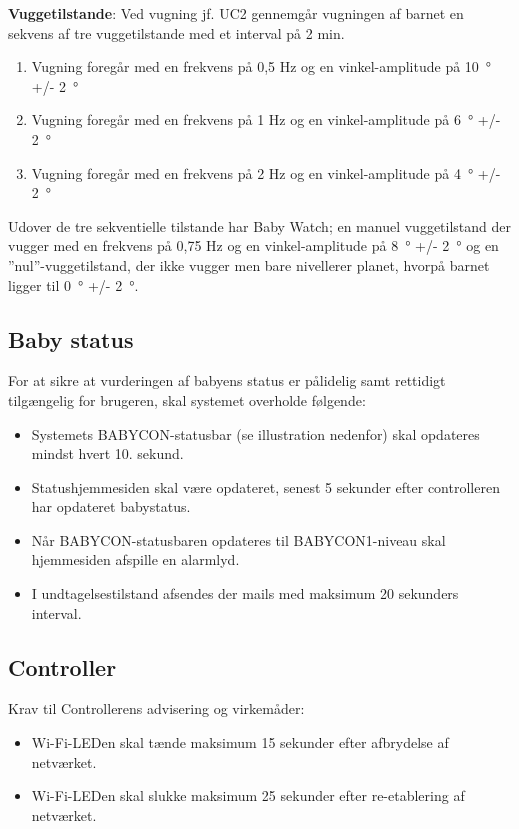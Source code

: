 \textbf{Vuggetilstande}: \label{kravspec:ikke_funk_vuggetilstande}
Ved vugning jf. UC2 gennemgår vugningen af barnet en sekvens af tre vuggetilstande med et interval på 2 min.
\begin{enumerate}

\item Vugning foregår med en frekvens på 0,5 Hz og en vinkel-amplitude på \SI{10}{\degree} +/- \SI{2}{\degree}
\item Vugning foregår med en frekvens på 1 Hz og en vinkel-amplitude på \SI{6}{\degree} +/- \SI{2}{\degree}
\item Vugning foregår med en frekvens på 2 Hz og en vinkel-amplitude på \SI{4}{\degree} +/- \SI{2}{\degree}
\end{enumerate}

Udover de tre sekventielle tilstande har Baby Watch; en manuel vuggetilstand der vugger med en frekvens på 0,75 Hz og en vinkel-amplitude på \SI{8}{\degree} +/- \SI{2}{\degree} og en ''nul''-vuggetilstand, der ikke vugger men bare nivellerer planet, hvorpå barnet ligger til \SI{0}{\degree} +/- \SI{2}{\degree}.

\subsection*{Baby status}
For at sikre at vurderingen af babyens status er pålidelig samt rettidigt tilgængelig for brugeren, skal systemet overholde følgende:
\begin{itemize}
\item Systemets BABYCON-statusbar (se illustration nedenfor) skal opdateres mindst hvert 10. sekund.
\item Statushjemmesiden skal være opdateret, senest 5 sekunder efter controlleren har opdateret babystatus.
\item Når BABYCON-statusbaren opdateres til BABYCON1-niveau skal hjemmesiden afspille en alarmlyd.
\item I undtagelsestilstand afsendes der mails med maksimum 20 sekunders interval. 
\end{itemize}

\subsection*{Controller}
Krav til Controllerens advisering og virkemåder:
\begin{itemize}
\item Wi-Fi-LEDen skal tænde maksimum 15 sekunder efter afbrydelse af netværket.
\item Wi-Fi-LEDen skal slukke maksimum 25 sekunder efter re-etablering af netværket.
\end{itemize}
